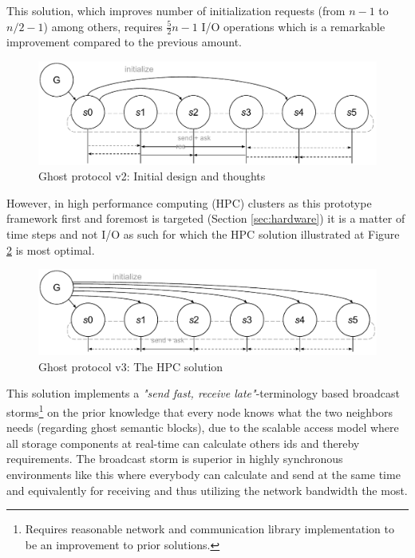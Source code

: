 This solution, which improves number of initialization requests (from $n-1$ to $n/2-1$) among others, requires $\frac{5}{2}n-1$ I/O operations which is a remarkable improvement compared to the previous amount.

\begin{figure}[ht!]
	\centering
	\vspace*{3mm}
	\includegraphics[scale=0.68]{pdf/ghost-v1.pdf}
	\caption{Ghost protocol v2: Initial design and thoughts \label{fig:ghost-v1}}
	\vspace*{3mm}
\end{figure}	

However, in high performance computing (HPC) clusters as this prototype framework first and foremost is targeted (Section \ref{sec:hardware}) it is a matter of time steps and not I/O as such for which the HPC solution illustrated at Figure \ref{fig:ghost-final} is most optimal.
\newline

\begin{figure}
	\centering
	\includegraphics[scale=0.68]{pdf/ghost-final.pdf}
	\caption{Ghost protocol v3: The HPC solution \label{fig:ghost-final}}
\end{figure}	

This solution implements a \textit{"send fast, receive late"}-terminology based broadcast storms\footnote{Requires reasonable network and communication library implementation to be an improvement to prior solutions.} on the prior knowledge that every node knows what the two neighbors needs (regarding ghost semantic blocks), due to the scalable access model where all storage components at real-time can calculate others ids and thereby requirements. The broadcast storm is superior in highly synchronous environments like this where everybody can calculate and send at the same time and equivalently for receiving and thus utilizing the network bandwidth the most. 

